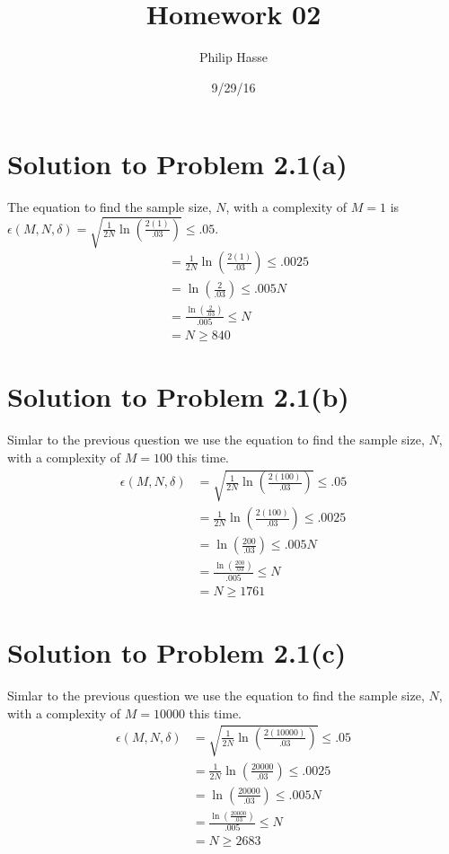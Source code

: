 \documentclass[a4paper]{article}
\title{Homework 02}
\author{Philip Hasse}
\date{9/29/16}
\begin{document}
\lstset{language=Python}

\maketitle

\section{Solution to Problem 2.1(a)}
The equation to find the sample size, $N$, with a complexity of $M=1$ is $\epsilon(M,N,\delta) = \sqrt{\frac{1}{2N}\ln(\frac{2(1)}{.03})} \le .05$.
\begin{align}
&= \frac{1}{2N}\ln(\frac{2(1)}{.03}) \le .0025 \\
&= \ln(\frac{2}{.03}) \le .005N \\
&= \frac{\ln(\frac{2}{.03})}{.005} \le N \\
&= N \ge 840
\end{align}
\section{Solution to Problem 2.1(b)}
Simlar to the previous question we use the equation to find the sample size, $N$, with a complexity of $M=100$ this time.
\begin{align}
 \epsilon(M,N,\delta) &= \sqrt{\frac{1}{2N}\ln(\frac{2(100)}{.03})} \le .05 \\
&= \frac{1}{2N}\ln(\frac{2(100)}{.03}) \le .0025 \\
&= \ln(\frac{200}{.03}) \le .005N \\
&= \frac{\ln(\frac{200}{.03})}{.005} \le N \\
&= N \ge 1761
\end{align}

\section{Solution to Problem 2.1(c)}
Simlar to the previous question we use the equation to find the sample size, $N$, with a complexity of $M=10000$ this time.
\begin{align}
 \epsilon(M,N,\delta) &= \sqrt{\frac{1}{2N}\ln(\frac{2(10000)}{.03})} \le .05 \\
&= \frac{1}{2N}\ln(\frac{20000}{.03}) \le .0025 \\
&= \ln(\frac{20000}{.03}) \le .005N \\
&= \frac{\ln(\frac{20000}{.03})}{.005} \le N \\
&= N \ge 2683
\end{align}
\end{document}

